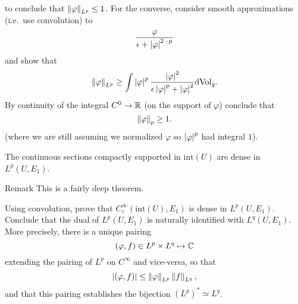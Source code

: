 \begin{defn}
\begin{xca}
\begin{equation*}
    \end{equation*}
    to conclude that $\left\lVert\varphi\right\rVert_{L^{p}}\le 1$. For the converse, consider smooth approximations (i.e.\ use convolution) to 
    \begin{equation*}
      \frac{\varphi}{\epsilon+\left|\varphi\right|^{2-p}}
    \end{equation*}
    and show that
    \begin{equation*}
      \left\lVert\varphi\right\rVert_{L^{p}}\ge \int\left|\varphi\right|^{p}\frac{\left|\varphi\right|^{2}}{\epsilon\left|\varphi\right|^{p}+\left|\varphi\right|^{2}}\mathrm{dVol}_{g}.
    \end{equation*}
    By continuity of the integral $C^{0}\to \mathbb{R}$ (on the support of $\varphi$) conclude that
    \begin{equation*}
      \left\lVert\varphi\right\rVert_{p}\ge 1.
    \end{equation*}
    (where we are still assuming we normalized $\varphi$ so $\left|\varphi\right|^{p}$ had integral $1$).
  \end{xca}
  \begin{thm}
    The continuous sections compactly supported in $\text{int}(U)$ are dense in $L^{p}(U,E_{1})$. 
  \end{thm}
  \begin{clear}{Remark}
    This is a fairly deep theorem.
  \end{clear}
  \begin{cor}
    Using convolution, prove that $C^{\infty}_{c}(\text{int}(U),E_{1})$ is dense in $L^{p}(U,E_{1})$. Conclude that the dual of $L^{p}(U,E_{1})$ is naturally identified with $L^{q}(U,E_{1})$. More precisely, there is a unique pairing
    \begin{equation*}
      (\varphi,f)\in L^{p}\times L^{q}\mapsto \mathbb{C}
    \end{equation*}
    extending the pairing of $L^{p}$ on $C^{\infty}$ and vice-versa, so that
    \begin{equation*}
      \left|(\varphi,f)\right|\le \left\lVert\varphi\right\rVert_{L^{p}}\left\lVert f\right\rVert_{L^{q}},
    \end{equation*}
    and that this pairing establishes the bijection $(L^{p})^{*}\simeq L^{q}$.
  \end{cor}  
\end{defn}
